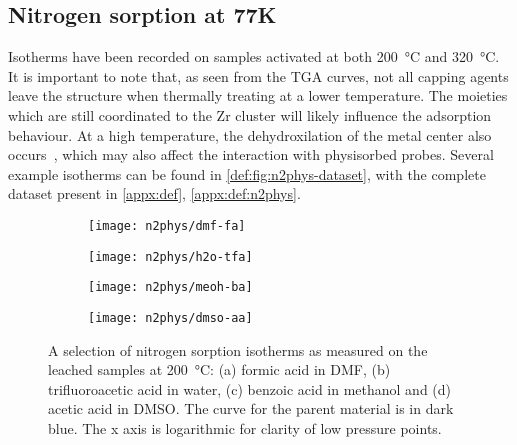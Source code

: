 
\subsection{Nitrogen sorption at 77K}

Isotherms have been recorded on samples activated at both
\SI{200}{\degreeCelsius} and \SI{320}{\degreeCelsius}.
It is important to note that, as seen from the \gls{TGA} curves,
not all capping agents leave the structure when thermally treating
at a lower temperature. The moieties which are still coordinated
to the Zr cluster will likely influence the adsorption
behaviour. At a high temperature, the dehydroxilation of the 
metal center also occurs~\cite{valenzanoDisclosingComplexStructure2011},
which may also affect the interaction with physisorbed probes. 
Several example isotherms can be found in
\autoref{def:fig:n2phys-dataset}, with the complete dataset
present in \autoref{appx:def}, \autoref{appx:def:n2phys}.

\begin{figure}[htbp]
	\centering

	\begin{subfigure}{0.5\linewidth}
		\texttt{[image: n2phys/dmf-fa]}%
		\caption{}%
		\label{def:fig:n2phys-dmf-fa}
	\end{subfigure}%
	\begin{subfigure}{0.5\linewidth}
		\texttt{[image: n2phys/h2o-tfa]}%
		\caption{}%
		\label{def:fig:n2phys-h2o-tfa}
	\end{subfigure}%

	\begin{subfigure}{0.5\linewidth}
		\texttt{[image: n2phys/meoh-ba]}%
		\caption{}%
		\label{def:fig:n2phys-meoh-ba}
	\end{subfigure}%
	\begin{subfigure}{0.5\linewidth}
		\texttt{[image: n2phys/dmso-aa]}%
		\caption{}%
		\label{def:fig:n2phys-dmso-aa}
	\end{subfigure}%

	\caption{A selection of nitrogen sorption isotherms as measured on the
		leached samples at \SI{200}{\degreeCelsius}: (a) formic acid in \gls{DMF},
		(b) trifluoroacetic acid in water, (c) benzoic acid
		in methanol and (d) acetic acid
        in \gls{DMSO}. The curve for the parent material is in dark blue.
        The x axis is logarithmic for clarity of low pressure 
        points.}%
	\label{def:fig:n2phys-dataset}
\end{figure}

